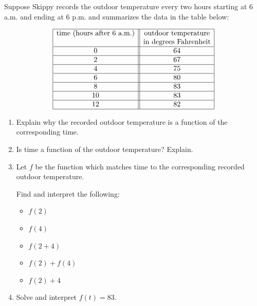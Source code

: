 \documentclass{ximera}
\begin{document}
\begin{example}\label{timetempex1}   Suppose Skippy records the outdoor temperature every two hours starting at 6 a.m. and ending at 6 p.m. and summarizes the data in the table below:



$$\begin{array}{|c||c|}  \hline

 \text{time (hours after 6 a.m.)} &  \text{outdoor temperature} \\
	                               & \text{in degrees Fahrenheit} \\ \hline
0 & 64  \\  \hline
2 & 67  \\  \hline
4 &  75  \\  \hline
6 &  80 \\  \hline
8 & 83  \\  \hline
10 &  83 \\  \hline
12 & 82  \\  \hline

\end{array}
$$



\begin{enumerate}

\item  Explain why the recorded outdoor temperature is a function of the corresponding time. 

\item  Is time a function of the outdoor temperature?  Explain.

\item Let $f$ be the function which matches time to the corresponding recorded outdoor temperature.

 Find and interpret the following:


\begin{itemize}

\item  $f(2)$

\item  $f(4)$

\item  $f(2+4)$

\item  $f(2) + f(4)$

\item  $f(2) + 4$

\end{itemize}


\item  Solve and interpret $f(t) = 83$. 


\end{enumerate}
\end{example}
\end{document}
